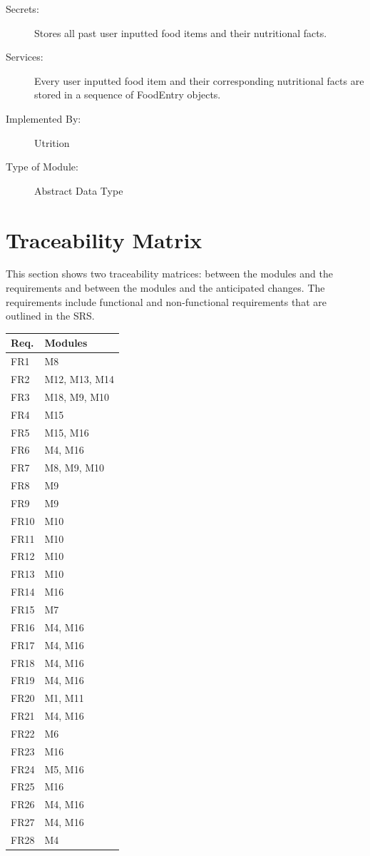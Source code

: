 \documentclass[12pt, titlepage]{article}
\begin{document}
\begin{description}
	\item[Secrets:]Stores all past user inputted food items and their 
	nutritional facts.
	\item[Services:]Every user inputted food item and their corresponding 
	nutritional facts are stored in a sequence of FoodEntry objects.
	\item[Implemented By:] Utrition
	\item[Type of Module:] Abstract Data Type
\end{description}

\section{Traceability Matrix} \label{SecTM}

This section shows two traceability matrices: between the modules and the
requirements and between the modules and the anticipated changes. The requirements include functional and non-functional requirements that are outlined in the SRS.

\begin{table}[H]
\centering
\begin{tabular}{p{} p{}}
\toprule
\textbf{Req.} & \textbf{Modules}\\
\midrule
FR1 & M8\\
FR2 & M12, M13, M14\\
FR3 & M18, M9, M10\\
FR4 & M15\\
FR5 & M15, M16\\
FR6 & M4, M16\\
FR7 & M8, M9, M10\\
FR8 & M9 \\
FR9 & M9 \\
FR10 & M10\\
FR11 & M10\\
FR12 & M10\\
FR13 & M10\\
FR14 & M16\\
FR15 & M7\\
FR16 & M4, M16\\
FR17 & M4, M16\\
FR18 & M4, M16\\
FR19 & M4, M16\\
FR20 & M1, M11\\
FR21 & M4, M16\\
FR22 & M6\\
FR23 & M16\\
FR24 & M5, M16\\
FR25 & M16\\
FR26 & M4, M16\\
FR27 & M4, M16\\
FR28 & M4\\
\bottomrule
\end{tabular}
\end{table}
\end{document}
